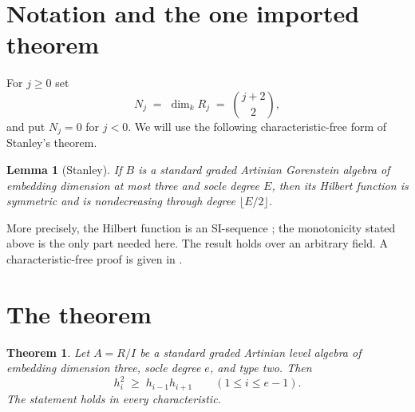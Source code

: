 \documentclass[11pt]{article}
\newtheorem{theorem}{Theorem}
\newtheorem{lemma}{Lemma}
\theoremstyle{remark}
\begin{document}
\section*{Notation and the one imported theorem}

For $j \ge 0$ set
\[
  N_j \;=\; \dim_k R_j \;=\; \binom{j+2}{2},
\]
and put $N_j = 0$ for $j < 0$. We will use the following
characteristic-free form of Stanley's theorem.

\begin{lemma}[Stanley] \label{lem:stanley}
If $B$ is a standard graded Artinian Gorenstein algebra of embedding
dimension at most three and socle degree $E$, then its Hilbert function is
symmetric and is nondecreasing through degree $\lfloor E/2 \rfloor$.
\end{lemma}

More precisely, the Hilbert function is an SI-sequence \cite{Stanley}; the
monotonicity stated above is the only part needed here. The result holds
over an arbitrary field. A characteristic-free proof is given in
\cite{ZanelloStanley}.

\section*{The theorem}

\begin{theorem} \label{thm:main}
Let $A = R/I$ be a standard graded Artinian level algebra of embedding
dimension three, socle degree $e$, and type two. Then
\[
  h_i^2 \;\ge\; h_{i-1} h_{i+1} \qquad (1 \le i \le e-1).
\]
The statement holds in every characteristic.
\end{theorem}
\end{document}
